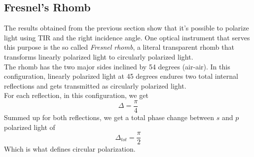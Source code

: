 \documentclass[../electromagnetism.tex]{subfiles}
\begin{document}
\subsection{Fresnel's Rhomb}
The results obtained from the previous section show that it's possible to polarize light using TIR and the right incidence angle. One optical instrument that serves this purpose is the so called \textit{Fresnel rhomb}, a literal transparent rhomb that transforms linearly polarized light to circularly polarized light.\\
The rhomb has the two major sides inclined by 54 degrees (air-air). In this configuration, linearly polarized light at 45 degrees endures two total internal reflections and gets transmitted as circularly polarized light.\\
For each reflection, in this configuration, we get
\begin{equation*}
	\Delta=\frac{\pi}{4}
\end{equation*}
Summed up for both reflections, we get a total phase change between $s$ and $p$ polarized light of
\begin{equation*}
	\Delta_{tot}=\frac{\pi}{2}
\end{equation*}
Which is what defines circular polarization.
\end{document}
